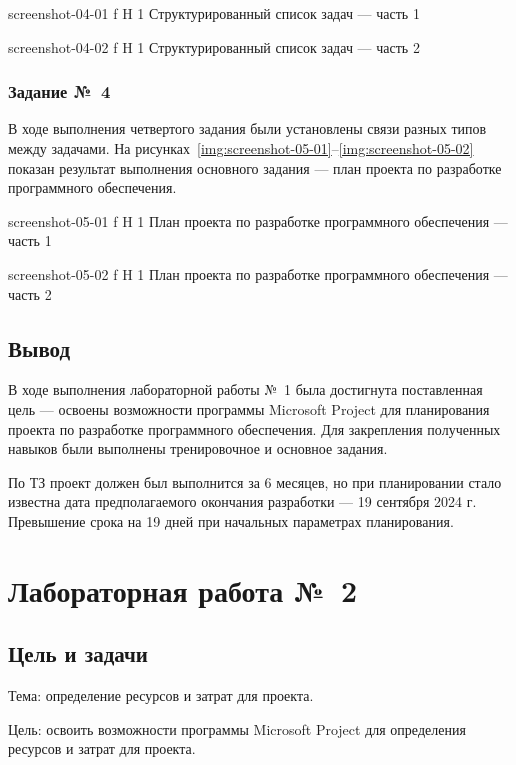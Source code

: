\documentclass{bmstu}
\begin{document}
    {screenshot-04-01}
    {f}
    {H}
    {1\textwidth}
    {Структурированный список задач --- часть 1}
    
    {screenshot-04-02}
    {f}
    {H}
    {1\textwidth}
    {Структурированный список задач --- часть 2}

\subsection{Задание №~4}

В ходе выполнения четвертого задания были установлены связи разных типов между задачами. 
На рисунках~\ref{img:screenshot-05-01}--\ref{img:screenshot-05-02} показан результат выполнения основного задания --- план проекта по разработке программного обеспечения.
    
    {screenshot-05-01}
    {f}
    {H}
    {1\textwidth}
    {План проекта по разработке программного обеспечения --- часть 1}
    
    {screenshot-05-02}
    {f}
    {H}
    {1\textwidth}
    {План проекта по разработке программного обеспечения --- часть 2}
    
\section{Вывод}

В ходе выполнения лабораторной работы №~1 была достигнута поставленная цель --- освоены возможности программы Microsoft Project для планирования проекта по разработке программного обеспечения. 
Для закрепления полученных навыков были выполнены тренировочное и основное задания.

По ТЗ проект должен был выполнится за 6 месяцев, но при планировании стало известна дата предполагаемого окончания разработки --- 19 сентября 2024 г. 
Превышение срока на 19 дней при начальных параметрах планирования.

\chapter{Лабораторная работа №~2}

\section{Цель и задачи}

Тема: определение ресурсов и затрат для проекта.

Цель: освоить возможности программы Microsoft Project для определения ресурсов и затрат для проекта.
\end{document}
